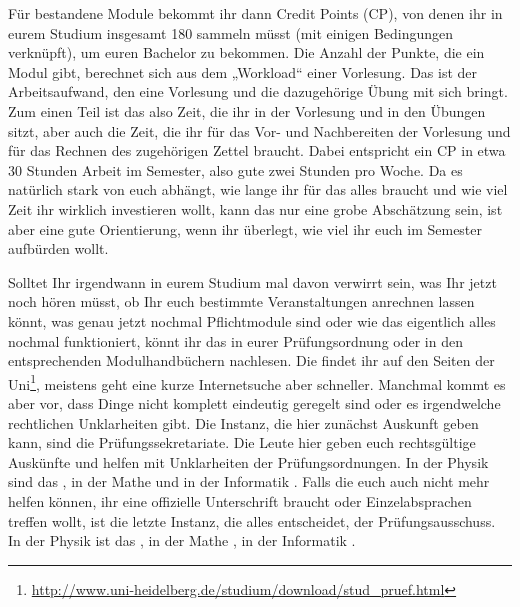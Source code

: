 Für bestandene Module bekommt ihr dann Credit Points (\gls{CP}), von denen ihr in eurem Studium insgesamt 180 sammeln müsst (mit einigen Bedingungen verknüpft), um euren Bachelor zu bekommen. Die Anzahl der Punkte, die ein Modul gibt, berechnet sich aus dem „Workload“ einer Vorlesung. Das ist der Arbeitsaufwand, den eine Vorlesung und die dazugehörige Übung mit sich bringt. Zum einen Teil ist das also Zeit, die ihr in der Vorlesung und in den Übungen sitzt, aber auch die Zeit, die ihr für das Vor- und Nachbereiten der Vorlesung und für das Rechnen des zugehörigen Zettel braucht. Dabei entspricht ein \gls{CP} in etwa 30 Stunden Arbeit im Semester, also gute zwei Stunden pro Woche. Da es natürlich stark von euch abhängt, wie lange ihr für das alles braucht und wie viel Zeit ihr wirklich investieren wollt, kann das nur eine grobe Abschätzung sein, ist aber eine gute Orientierung, wenn ihr überlegt, wie viel ihr euch im Semester aufbürden wollt.

Solltet Ihr irgendwann in eurem Studium mal davon verwirrt sein, was Ihr jetzt noch hören müsst, ob Ihr euch bestimmte Veranstaltungen anrechnen lassen könnt, was genau jetzt nochmal Pflichtmodule sind oder wie das eigentlich alles nochmal funktioniert, könnt ihr das in eurer Prüfungsordnung oder in den entsprechenden Modulhandbüchern nachlesen. Die findet ihr auf den Seiten der Uni\footnote{\url{http://www.uni-heidelberg.de/studium/download/stud_pruef.html}}, meistens geht eine kurze Internetsuche aber schneller. Manchmal kommt es aber vor, dass Dinge nicht komplett eindeutig geregelt sind oder es irgendwelche rechtlichen Unklarheiten gibt. Die Instanz, die hier zunächst Auskunft geben kann, sind die Prüfungssekretariate. Die Leute hier geben euch rechtsgültige Auskünfte und helfen mit Unklarheiten der Prüfungsordnungen. In der Physik sind das \pruefsekphysik, in der Mathe \pruefsekmathe und in der Informatik \pruefsekinfo. Falls die euch auch nicht mehr helfen können, ihr eine offizielle Unterschrift braucht oder Einzelabsprachen treffen wollt, ist die letzte Instanz, die alles entscheidet, der Prüfungsausschuss. In der Physik ist das \pruefausschussvorsitzphysik, in der Mathe \pruefausschussvorsitzmathe, in der Informatik \pruefausschussvorsitzinformatik.
